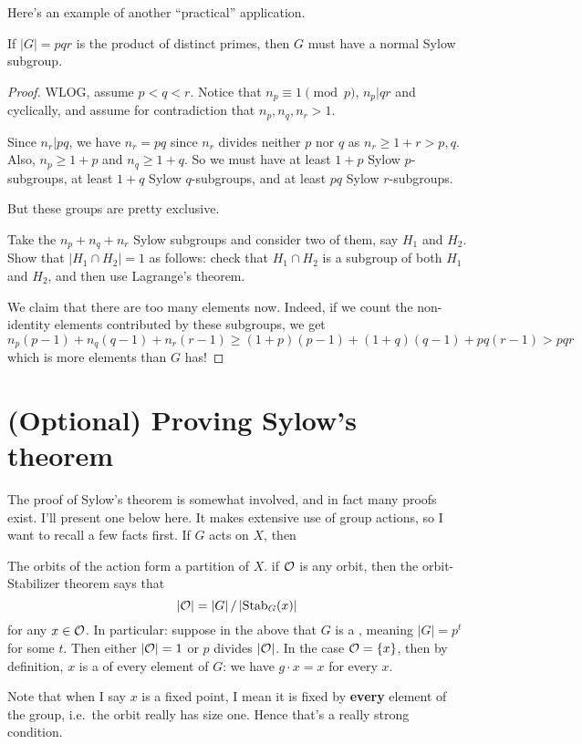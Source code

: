 Here's an example of another ``practical'' application.
\begin{proposition}
	If $\left\lvert G \right\rvert = pqr$ is the product of distinct primes,
	then $G$ must have a normal Sylow subgroup.
\end{proposition}
\begin{proof}
	WLOG, assume $p<q<r$.  Notice that $n_p \equiv 1 \pmod p$, $n_p | qr$ and cyclically, and assume for contradiction that $n_p, n_q, n_r > 1$.
	
	Since $n_r | pq$, we have $n_r = pq$ since $n_r$ divides neither $p$ nor $q$ as $n_r \ge 1 + r > p,q$.  Also, $n_p \ge 1+p$ and $n_q \ge 1+q$.
	So we must have at least $1+p$ Sylow $p$-subgroups,
	at least $1+q$ Sylow $q$-subgroups, and at least $pq$ Sylow $r$-subgroups.

	But these groups are pretty exclusive.
	\begin{ques}
		Take the $n_p+n_q+n_r$ Sylow subgroups and consider two of them, 
		say $H_1$ and $H_2$.
		Show that $\left\lvert H_1 \cap H_2 \right\rvert = 1$
		as follows:
		check that $H_1 \cap H_2$ is a subgroup of both $H_1$ and $H_2$,
		and then use Lagrange's theorem.
	\end{ques}

	We claim that there are too many elements now.
	Indeed, if we count the non-identity elements contributed by these subgroups, we get
	\[ n_p(p-1) + n_q(q-1) + n_r(r-1)
		\ge (1+p)(p-1) + (1+q)(q-1) + pq(r-1) > pqr 
	\]
	which is more elements than $G$ has!
\end{proof}


\section{(Optional) Proving Sylow's theorem}
The proof of Sylow's theorem is somewhat involved,
and in fact many proofs exist.  I'll present one below here.
It makes extensive use of group actions,
so I want to recall a few facts first.
If $G$ acts on $X$, then
\begin{itemize}
	\ii The orbits of the action form a partition of $X$.
	\ii if $\mathcal O$ is any orbit, then the orbit-Stabilizer theorem says that
	\[ \left\lvert \mathcal O \right\rvert = \left\lvert G \right\rvert / \left\lvert \operatorname{Stab}_G(x) \right\rvert \]
	for any $x \in \mathcal O$.
	\ii In particular: suppose in the above that $G$ is a ,
	meaning $|G| = p^t$ for some $t$.
	Then either $\left\lvert \mathcal O \right\rvert = 1$ or $p$ divides $\left\lvert \mathcal O \right\rvert$.
	In the case $\mathcal O = \{x\}$, then by definition, $x$ is a  of every element of $G$: we have $g \cdot x = x$ for every $x$.
\end{itemize}
Note that when I say $x$ is a fixed point, I mean it is fixed by \textbf{every} element of the group, i.e.\ the orbit really has size one. Hence that's a really strong condition.

